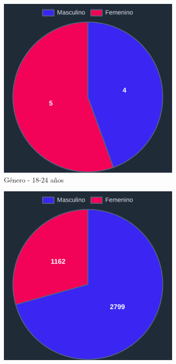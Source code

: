 \begin{figure}[H]
\begin{subfigure}{0.3\textwidth}
   \includegraphics[width=\textwidth]{imaxes/capturas-app/graficos/modaresi/grafico-genero-jj.png}
  \caption{Género - 18-24 años}
  \end{subfigure}
  \begin{subfigure}{0.3\textwidth}
   \includegraphics[width=\textwidth]{imaxes/capturas-app/graficos/modaresi/grafico-genero-j.png}

\end{subfigure}
\end{figure}
